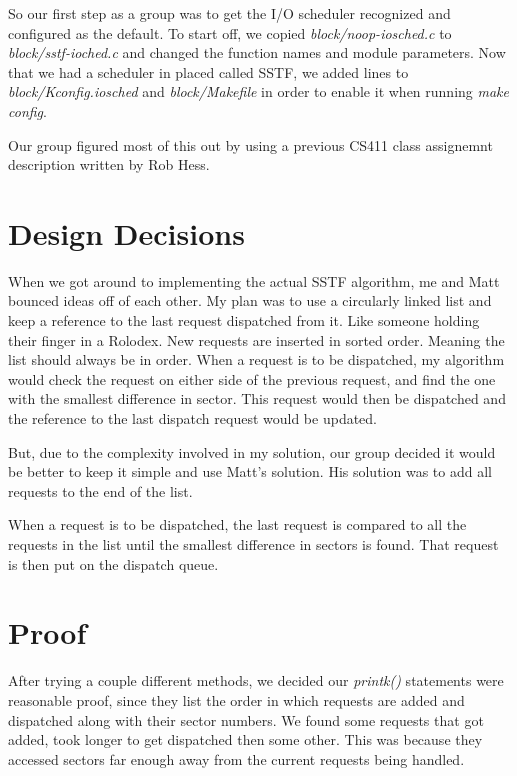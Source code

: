 \documentclass[letterpaper,10pt,titlepage]{article}
\begin{document}
So our first step as a group was to get the I/O scheduler recognized and
configured as the default. To start off, we copied
\emph{block/noop-iosched.c} to \emph{block/sstf-ioched.c} and changed
the function names and module parameters. Now that we had a scheduler in
placed called SSTF, we added lines to \emph{block/Kconfig.iosched} and
\emph{block/Makefile} in order to enable it when running \emph{make
config}.

Our group figured most of this out by using a previous CS411 class
assignemnt description written by Rob Hess.

\section*{Design Decisions}

When we got around to implementing the actual SSTF algorithm, me and
Matt bounced ideas off of each other. My plan was to use a circularly
linked list and keep a reference to the last request dispatched from it.
Like someone holding their finger in a Rolodex. New requests are
inserted in sorted order. Meaning the list should always be in order.
When a request is to be dispatched, my algorithm would check the
request on either side of the previous request, and find the one with the
smallest difference in sector. This request would then be dispatched and
the reference to the last dispatch request would be updated.

But, due to the complexity involved in my solution, our group decided it
would be better to keep it simple and use Matt's solution. His solution
was to add all requests to the end of the list. 



When a request is to be
dispatched, the last request is compared to all the requests in the list
until the smallest difference in sectors is found. That request is then
put on the dispatch queue.



\section*{Proof}

After trying a couple different methods, we decided our \emph{printk()}
statements were reasonable proof, since they list the order in which
requests are added and dispatched along with their sector numbers. We
found some requests that got added, took longer to get dispatched then
some other. This was because they accessed sectors far enough away from
the current requests being handled.
\end{document}
